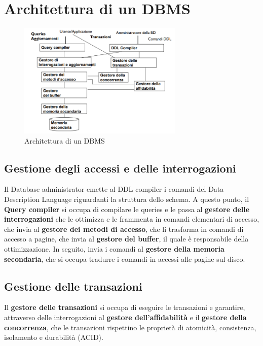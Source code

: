 \section{Architettura di un DBMS}
\begin{figure}
      \centering
      \includegraphics[width=0.7\textwidth]{./img/DBMS/Architettura.png}
      \caption{Architettura di un DBMS}
      \label{fig:DBMS_architecture}
\end{figure}
\subsection{Gestione degli accessi e delle interrogazioni}
Il Database administrator emette al DDL compiler i comandi del Data Description
Language riguardanti la struttura dello schema. A questo punto, il \textbf{Query
      compiler} si occupa di compilare le queries e le passa al \textbf{gestore
      delle interrogazioni} che le ottimizza e le frammenta in comandi elementari
di accesso, che invia al \textbf{gestore dei metodi di accesso}, che li trasforma
in comandi di accesso a pagine, che invia al \textbf{gestore del buffer}, il
quale è responsabile della ottimizzazione. In seguito, invia i comandi al
\textbf{gestore della memoria secondaria}, che si occupa tradurre i comandi in
accessi alle pagine sul disco.
\subsection{Gestione delle transazioni}
Il \textbf{gestore delle transazioni} si occupa di eseguire le transazioni e
garantire, attraverso delle interrogazioni al \textbf{gestore dell'affidabilità}
e il \textbf{gestore della concorrenza}, che le transazioni rispettino le
proprietà di atomicità, consistenza, isolamento e durabilità (ACID).
